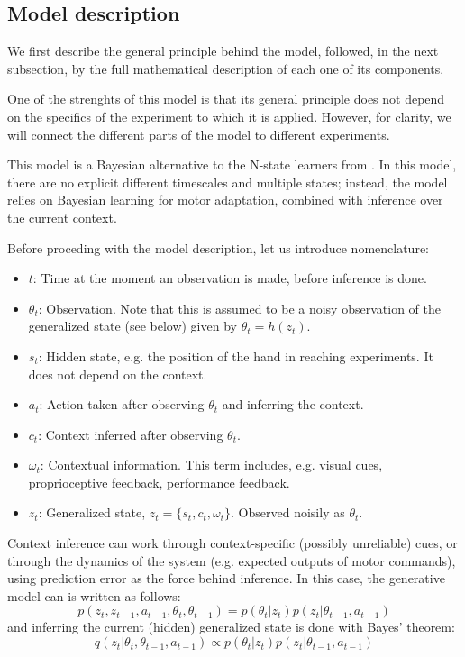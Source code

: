 \documentclass[a4paper,doc,floatsintext,natbib]{apa6}
\begin{document}
\subsection{Model description}
We first describe the general principle behind the model, followed, in the next
subsection, by the full mathematical description of each one of its components.

One of the strenghts of this model is that its general principle does not
depend on the specifics of the experiment to which it is applied. However, for
clarity, we will connect the different parts of the model to different
experiments.

This model is a Bayesian alternative to the N-state learners from
\citep[e.g.][]{Lee_Dual_2009}. In this model, there are no explicit different
timescales and multiple states; instead, the model relies on Bayesian learning
for motor adaptation, combined with inference over the current context.

Before proceding with the model description, let us introduce nomenclature:
\begin{itemize}
\item $t$: Time at the moment an observation is made, before inference is done.
\item $\theta_t$: Observation. Note that this is assumed to be a noisy
observation of the generalized state (see below) given by $\theta_t = h(z_t)$.
\item $s_t$: Hidden state, e.g. the position of the hand in reaching
experiments. It does not depend on the context.
\item $a_t$: Action taken after observing $\theta_t$ and inferring the context.
\item $c_t$: Context inferred after observing $\theta_t$.
\item $\omega_t$: Contextual information. This term includes, e.g. visual cues,
proprioceptive feedback, performance feedback.
\item $z_t$: Generalized state, $z_t = \{s_t, c_t, \omega_t\}$. Observed noisily
as $\theta_t$.
\end{itemize}

Context inference can work through context-specific (possibly unreliable) cues,
or through the dynamics of the system (e.g. expected outputs of motor
commands), using prediction error as the force behind inference. In this case,
the generative model can is written as follows:
\[
p(z_t, z_{t-1}, a_{t-1}, \theta_t, \theta_{t-1}) = p(\theta_t | z_t)p(z_t|\theta_{t-1}, a_{t-1})
\]
and inferring the current (hidden) generalized state is done with Bayes' theorem:
\[
  q(z_t | \theta_t, \theta_{t-1}, a_{t-1}) \propto p(\theta_t | z_t)p(z_t|\theta_{t-1}, a_{t-1})
\]
  
\end{document}
